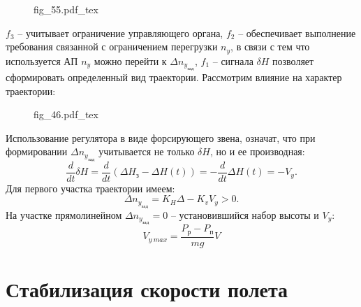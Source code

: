 \documentclass{article}
\newcommand{\incfig}[1]{
    {#1.pdf_tex}
}
\begin{document}
\begin{figure}[ht]
	\centering
	\incfig{fig_55}
	\label{fig:fig_55}
\end{figure}

$f_3$ -- учитывает ограничение управляющего органа, $f_2$ -- обеспечивает
выполнение требования связанной с ограничением перегрузки $n_y$, в связи с тем
что используется АП $n_y$ можно перейти к $ \Delta n_{y_\text{зад}}$, $f_1$ --
сигнала $\delta H$ позволяет сформировать определенный вид траектории.
Рассмотрим влияние на характер траектории:

\begin{figure}[ht]
	\centering
	\incfig{fig_46}
	\label{fig:fig_46}
\end{figure}

Использование регулятора в виде форсирующего звена, означат, что при
формировании $ \Delta n_{y_\text{зад}}$ учитывается не только $\delta H$, но и
ее производная:
\[
	\frac{d}{dt} \delta H = \frac{d}{dt} (\Delta H_\text{з} - \Delta H (t)) = -
	\frac{d}{dt} \Delta H(t) = -V_y
	.\]
Для первого участка траектории имеем:
\[
	\Delta n_{y_\text{зад}} = K_H \Delta - K_v V_y > 0
	.\]
На участке прямолинейном $ \Delta n_{y_\text{зад}} = 0$ -- установившийся набор
высоты и $V_y$:
\[
	V_{y \ max} = \frac{P_\text{р} - P_\text{п}}{mg}V
\]

\section{Стабилизация скорости полета}
\end{document}
